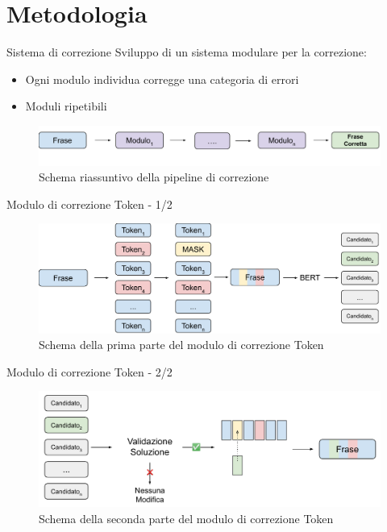 \documentclass{beamer}
\begin{document}
\section{Metodologia}

\begin{frame}{Sistema di correzione}
Sviluppo di un sistema modulare per la correzione:
\begin{itemize}
\item Ogni modulo individua corregge una categoria di errori
\item Moduli ripetibili 
\end{itemize}

\begin{figure}[H]
\centering
\includegraphics[width=\textwidth]{images/slides/generale}
\caption{Schema riassuntivo della pipeline di correzione}
\label{fig:met_generale}
\end{figure}


\end{frame}

\begin{frame}{Modulo di correzione Token - 1/2}
	\begin{figure}[H]	
	\includegraphics[width=\textwidth]{images/slides/Schema_modulo}
	\caption{Schema della prima parte del modulo di correzione Token}
	\end{figure}
\end{frame}

\begin{frame}{Modulo di correzione Token - 2/2}
	\begin{figure}[H]	
	\includegraphics[width=\textwidth]{images/slides/Scelta_candidati}
	\caption{Schema della seconda parte del modulo di correzione Token}
	\end{figure}
\end{frame}
\end{document}
